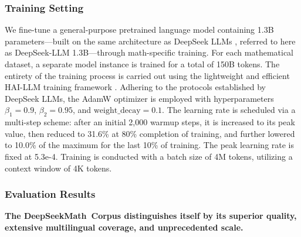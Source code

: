 \begin{itemize}[topsep=0pt]
\subsubsection{Training Setting}
\label{sec:quality-policy}
We fine-tune a general-purpose pretrained language model containing 1.3B parameters—built on the same architecture as DeepSeek LLMs \citep{deepseek-llm}, referred to here as DeepSeek-LLM 1.3B—through math-specific training. For each mathematical dataset, a separate model instance is trained for a total of 150B tokens. The entirety of the training process is carried out using the lightweight and efficient HAI-LLM training framework \citep{haillm}. Adhering to the protocols established by DeepSeek LLMs, the AdamW optimizer \citep{adamW} is employed with hyperparameters $\beta_1=0.9$, $\beta_2=0.95$, and $\mathrm{weight\_decay}=0.1$. The learning rate is scheduled via a multi-step scheme: after an initial 2,000 warmup steps, it is increased to its peak value, then reduced to 31.6\% at 80\% completion of training, and further lowered to 10.0\% of the maximum for the last 10\% of training. The peak learning rate is fixed at 5.3e-4. Training is conducted with a batch size of 4M tokens, utilizing a context window of 4K tokens.

\subsubsection{Evaluation Results}

\textbf{The DeepSeekMath~Corpus distinguishes itself by its superior quality, extensive multilingual coverage, and unprecedented scale.}


\end{itemize}
